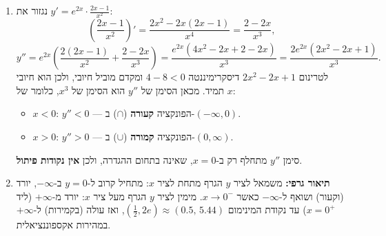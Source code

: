 \begin{solution}
\begin{enumerate}
  \item נגזור את $y'=e^{2x}\cdot\frac{2x-1}{x^2}$:
  \[ \left(\frac{2x-1}{x^2}\right)'=\frac{2x^2-2x(2x-1)}{x^4}=\frac{2-2x}{x^3}, \]
  \[ y''=e^{2x}\left(\frac{2(2x-1)}{x^2}+\frac{2-2x}{x^3}\right)=\frac{e^{2x}\left(4x^2-2x+2-2x\right)}{x^3}=\frac{2e^{2x}\left(2x^2-2x+1\right)}{x^3}. \]
  לטרינום $2x^2-2x+1$ דיסקרימיננטה $4-8<0$ ומקדם מוביל חיובי, ולכן הוא חיובי תמיד. מכאן הסימן של $y''$ הוא הסימן של $x^3$, כלומר של $x$:
  \begin{itemize}
    \item $x<0$: $y''<0$ — הפונקציה \textbf{קעורה} ($\cap$) ב-$(-\infty,0)$.
    \item $x>0$: $y''>0$ — הפונקציה \textbf{קמורה} ($\cup$) ב-$(0,\infty)$.
  \end{itemize}
  סימן $y''$ מתחלף רק ב-$x=0$, שאינה בתחום ההגדרה, ולכן \textbf{אין נקודות פיתול}.

  \item \textbf{תיאור גרפי:} משמאל לציר $y$ הגרף מתחת לציר $x$: מתחיל קרוב ל-$y=0$ ב-$-\infty$, יורד (וקעור) ושואף ל-$-\infty$ כאשר $x\to0^-$. מימין לציר $y$ הגרף מעל ציר $x$: יורד מ-$+\infty$ (ליד $x=0^+$) עד נקודת המינימום $(\frac12,2e)\approx(0.5,\,5.44)$, ואז עולה (בקמירות) ל-$+\infty$ במהירות אקספוננציאלית.
\end{enumerate}
\end{solution}
